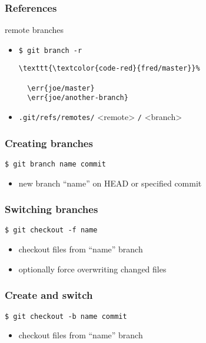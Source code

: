 \documentclass[english]{beamer}
\newcommand{\CMD}[1]{%
\texttt{\textcolor{code-green}{#1}}%
}
\newcommand{\cmd}[1]{%
\texttt{\textcolor{code-orange}{#1}}%
}
\newcommand{\err}[1]{%
\texttt{\textcolor{code-red}{#1}}%
}
\newcommand{\fnt}[1]{%
\texttt{\textcolor{code-gray}{#1}}%
}
\newcommand{\faint}[1]{%
\textcolor{code-gray}{#1}%
}
\begin{document}
\begin{frame}[fragile]
\frametitle{References}
remote branches
\begin{itemize}
        \item \CMD{\$ git branch -r} \\
                {\small
                \begin{Verbatim}[commandchars=\\\{\}]
  \err{fred/master}
  \err{joe/master}
  \err{joe/another-branch}
                \end{Verbatim}
                }
        \item \cmd{.git/refs/remotes/}<remote>\cmd{/}<branch>
\end{itemize}
\end{frame}

\begin{frame}
\frametitle{Creating branches}

\CMD{\$ git branch name \fnt{commit}}
\begin{itemize}
        \item new branch ``name'' on HEAD \faint{or specified} commit
\end{itemize}

\end{frame}

\begin{frame}
\frametitle{Switching branches}

\CMD{\$ git checkout \fnt{-f} name}
\begin{itemize}
        \item checkout files from ``name'' branch
        \item \faint{optionally} force overwriting changed files
\end{itemize}

\end{frame}

\begin{frame}
\frametitle{Create and switch}

\CMD{\$ git checkout -b name \fnt{commit}}
\begin{itemize}
        \item checkout files from ``name'' branch
\end{itemize}

\end{frame}
\end{document}
